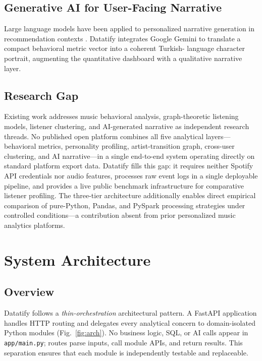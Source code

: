 \documentclass[conference]{IEEEtran}
\begin{document}
\subsection{Generative AI for User-Facing Narrative}

Large language models have been applied to personalized narrative generation
in recommendation contexts \cite{li2023gpt4rec}. Datatify integrates Google
Gemini to translate a compact behavioral metric vector into a coherent Turkish-
language character portrait, augmenting the quantitative dashboard with a
qualitative narrative layer.

\subsection{Research Gap}

Existing work addresses music behavioral analysis, graph-theoretic listening
models, listener clustering, and AI-generated narrative as independent
research threads. No published open platform combines all five analytical
layers—behavioral metrics, personality profiling, artist-transition graph,
cross-user clustering, and AI narrative—in a single end-to-end system
operating directly on standard platform export data. Datatify fills this gap:
it requires neither Spotify API credentials nor audio features, processes raw
event logs in a single deployable pipeline, and provides a live public
benchmark infrastructure for comparative listener profiling. The three-tier
architecture additionally enables direct empirical comparison of pure-Python,
Pandas, and PySpark processing strategies under controlled conditions—a
contribution absent from prior personalized music analytics platforms.

\section{System Architecture}

\subsection{Overview}

Datatify follows a \emph{thin-orchestration} architectural pattern. A FastAPI
application handles HTTP routing and delegates every analytical concern to
domain-isolated Python modules (Fig.~\ref{fig:arch}). No business logic,
SQL, or AI calls appear in \texttt{app/main.py}; routes parse inputs, call
module APIs, and return results. This separation ensures that each module
is independently testable and replaceable.
\end{document}
